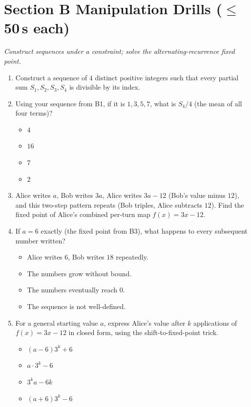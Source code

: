 \documentclass[11pt,a4paper]{article}
\begin{document}
\section*{Section B \quad Manipulation Drills \hfill{\normalfont\small($\leq$50\,s each)}}

\noindent\textit{Construct sequences under a constraint; solve the alternating-recurrence fixed point.}

\begin{enumerate}

\item Construct a sequence of $4$ distinct positive integers such that every partial sum $S_1,S_2,S_3,S_4$ is divisible by its index.

\item Using your sequence from B1, if it is $1,3,5,7$, what is $S_4/4$ (the mean of all four terms)?
\begin{itemize}
\item[A)] $4$
\item[B)] $16$
\item[C)] $7$
\item[D)] $2$
\end{itemize}

\item Alice writes $a$, Bob writes $3a$, Alice writes $3a-12$ (Bob's value minus $12$), and this two-step pattern repeats (Bob triples, Alice subtracts $12$). Find the fixed point of Alice's combined per-turn map $f(x)=3x-12$.

\item If $a=6$ exactly (the fixed point from B3), what happens to every subsequent number written?
\begin{itemize}
\item[A)] Alice writes $6$, Bob writes $18$ repeatedly.
\item[B)] The numbers grow without bound.
\item[C)] The numbers eventually reach $0$.
\item[D)] The sequence is not well-defined.
\end{itemize}

\item For a general starting value $a$, express Alice's value after $k$ applications of $f(x)=3x-12$ in closed form, using the shift-to-fixed-point trick.
\begin{itemize}
\item[A)] $(a-6)3^k+6$
\item[B)] $a\cdot3^k-6$
\item[C)] $3^ka-6k$
\item[D)] $(a+6)3^k-6$
\end{itemize}


\end{enumerate}
\end{document}
